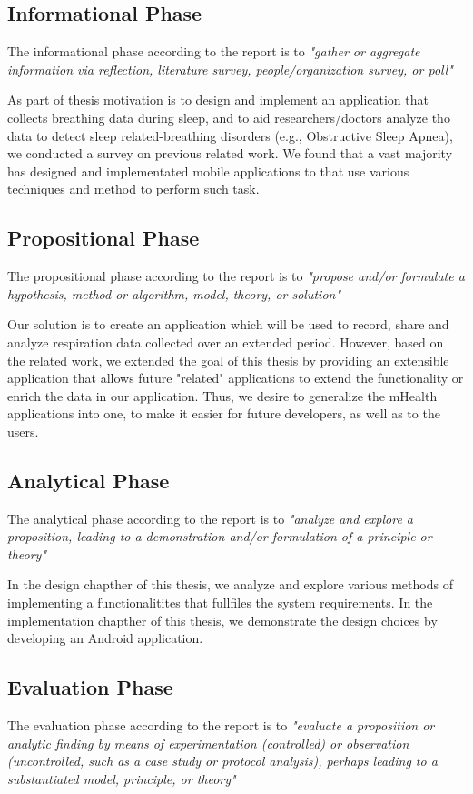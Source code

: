 \subsection{Informational Phase}
The informational phase according to the report is to \textit{"gather or aggregate information via reflection, literature survey, people/organization survey, or poll"}

As part of thesis motivation is to design and implement an application that collects breathing data during sleep, and to aid researchers/doctors analyze tho data to detect sleep related-breathing disorders (e.g., Obstructive Sleep Apnea), we conducted a survey on previous related work. We found that a vast majority has designed and implementated mobile applications to that use various techniques and method to perform such task.

\subsection{Propositional Phase}
The propositional phase according to the report is to \textit{"propose and/or formulate a hypothesis, method or algorithm, model, theory, or solution"}

Our solution is to create an application which will be used to record, share and analyze respiration data collected over an extended period. However, based on the related work, we extended the goal of this thesis by providing an extensible application that allows future "related" applications to extend the functionality or enrich the data in our application. Thus, we desire to generalize the mHealth applications into one, to make it easier for future developers, as well as to the users. 

\subsection{Analytical Phase}
The analytical phase according to the report is to \textit{"analyze and explore a proposition, leading to a demonstration and/or formulation of a principle or theory"}

In the design chapther of this thesis, we analyze and explore various methods of implementing a functionalitites that fullfiles the system requirements. In the implementation chapther of this thesis, we demonstrate the design choices by developing an Android application. 

\subsection{Evaluation Phase}
The evaluation phase according to the report is to \textit{"evaluate a proposition or analytic finding by means of experimentation (controlled) or observation (uncontrolled, such as a case study or protocol analysis), perhaps leading to a substantiated model, principle, or theory"}

